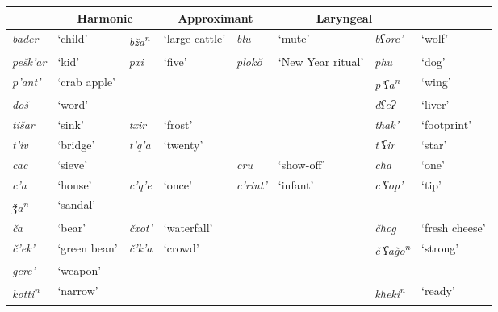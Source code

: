 \begin{sidewaystable}
	\begin{tabular}{llllllll}
		\lsptoprule
		\multicolumn{2}{c}{{Single}} & \multicolumn{2}{c}{{Harmonic}} & \multicolumn{2}{c}{{Approximant}} & \multicolumn{2}{c}{{Laryngeal}} \\
		\midrule
		\textit{bader} & `child' & \textit{bža\textsuperscript{n}} & `large cattle' & \textit{blu-} &  `mute' & \textit{bʕorc'} & `wolf' \\
		\textit{pešk'ar} & `kid' & \textit{pxi} & `five' & \textit{plok\u{o}} & `New Year ritual' & \textit{pħu} & `dog' \\
		\textit{p'ant'} & `crab apple' & & & & &  \textit{p'ʕa\textsuperscript{n}} & `wing' \\
		
		\midrule
		
		\textit{doš} & `word' & & & & & \textit{dʕeɁ} & `liver' \\
		\textit{tišar} & `sink' & \textit{txir} & `frost' & & & \textit{tħak'} & `footprint' \\
		\textit{t'iv} & `bridge' & \textit{t'q'a} & `twenty' & & & \textit{t'ʕir} & `star' \\
		
		\midrule
		
		\textit{cac} & `sieve' & & & \textit{cru} & `show-off'   & \textit{cħa} & `one'  \\
		
		\textit{c'a} & `house' & \textit{c'q'e} & `once' & \textit{c'rint'} & `infant'  & \textit{c'ʕop'} & `tip' \\
		
		\midrule
		
		\textit{ǯa\textsuperscript{n}} & `sandal' & & & & & & \\
		
		\textit{ča} & `bear' & \textit{čxot'} & `waterfall' & & &  \textit{čħog} & `fresh cheese'  \\
		
		\textit{č'ek'} & `green bean' & \textit{č'k'a} & `crowd' & & & \textit{č'ʕa\u{g}o\textsuperscript{n}}  & `strong'  \\
		
		\midrule
		
		\textit{gerc'} & `weapon' &  \\
		
		\textit{kotti\textsuperscript{n}} & `narrow' & & & & & \textit{kħeki\textsuperscript{n}} & `ready' \\
		

\end{tabular}
\end{sidewaystable}
